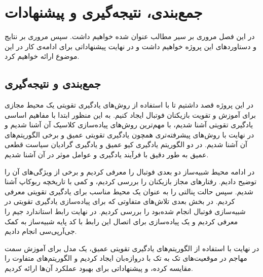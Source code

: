 \chapter{جمع‌بندی، نتیجه‌گیری و پیشنهادات}
در این فصل مروری بر سیر مطالب عنوان شده خواهیم داشت.
سپس مروری بر نتایج‌ و دستاورد‌های این پروژه خواهیم داشت و در نهایت پیشنهاداتی برای ادامه‌ی کار در این موضوع ارائه خواهیم کرد.
\section{جمع‌بندی و نتیجه‌گیری}
در این پروژه قصد داشتیم تا با استفاده از روش‌های یادگیری تقویتی یک محیط مجازی برای آموزش و تقویت بازیکنان فوتبال ایجاد کنیم.
به این منظور ابتدا با مفاهیم اساسی یادگیری تقویتی آشنا شدیم،
با مهم‌ترین روش‌های پیاده‌سازی کلاسیک آن آشنا شدیم و در نهایت با روش‌های پیشرفته‌تری همچون یادگیری تقویتی عمیق و برخی الگوریتم‌های آن آشنا شدیم.
در دو الگوریتم یادگیری کیو عمیق و یادگیری گرادیان سیاست قطعی عمیق به طور دقیق با فرآیند یادگیری و عوامل موثر در آن آشنا شدیم.

در ادامه محیط شبیه‌ساز دو بعدی فوتبال را معرفی کردیم و برخی از ویژگی‌های آن را توضیح دادیم.
رفتار‌های مجاز بازیکنان را بررسی کردیم، و کمی با تاریخچه ربوکاپ آشنا شدیم. سپس حالت پنالتی را به عنوان یک محیط مناسب برای یادگیری تقویتی معرفی کردیم.
در بخش بعدی تلاش‌های متفاوتی که برای پیاده‌سازی یادگیری تقویتی در شبیه‌سازی فوتبال انجام شده‌بود را بررسی کردیم.
در نهایت رابط استاندارد جیم را معرفی کردیم و یک پیاده‌سازی برای اتصال این رابط با کد پایه شبیه‌ساز به کمک جی‌آر‌پی‌سی انجام دادیم.

در نهایت با استفاده از الگوریتم‌های یادگیری تقویتی عمیق، یک مدل برای آموزش سمت مهاجم در موقعیت‌های تک به تک با دروازه‌بان ایجاد کردیم و الگوریتم‌های متفاوت را مقایسه کرده، و پیشنهاداتی برای بهبود عملکرد آن‌ها ارائه کردیم.
